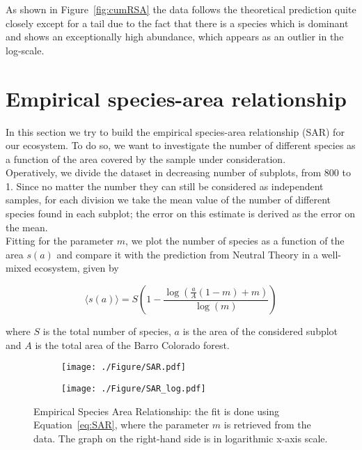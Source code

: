 \documentclass[a4paper,11pt]{article}
\begin{document}
As shown in Figure~\ref{fig:cumRSA} the data follows the theoretical prediction quite closely except for a tail due to the fact that there is a species which is dominant and shows an exceptionally high abundance, which appears as an outlier in the log-scale.


\section{Empirical species-area relationship}
In this section we try to build the empirical species-area relationship (SAR) for our ecosystem. To do so, we want to investigate the number of different species as a function of the area covered by the sample under consideration.
\\
Operatively, we divide the dataset in decreasing number of subplots, from 800 to 1. Since no matter the number they can still be considered as independent samples, for each division we take the mean value of the number of different species found in each subplot; the error on this estimate is derived as the error on the mean.
\\
Fitting for the parameter $m$, we plot the number of species as a function of the area $s(a)$ and compare it with the prediction from Neutral Theory in a well-mixed ecosystem, given by

\begin{equation}
    \label{eq:SAR}
    \langle s(a) \rangle = S \left(1- \frac{\log(\frac{a}{A}(1-m)+m)}{\log(m)}\right)
\end{equation}

where $S$ is the total number of species, $a$ is the area of the considered subplot and $A$ is the total area of the Barro Colorado forest.

\begin{figure}[htp]
  \centering
  \begin{subfigure}{.49\textwidth}
    \centering
    \texttt{[image: ./Figure/SAR.pdf]}  
  \label{fig:SARnormal}
  \end{subfigure}%
  \begin{subfigure}{.49\textwidth}
  \centering
  \texttt{[image: ./Figure/SAR\_log.pdf]}  
  \label{fig:SARlog}
  \end{subfigure}
  \caption{Empirical Species Area Relationship: the fit is done using Equation~\ref{eq:SAR}, where the parameter $m$ is retrieved from the data. The graph on the right-hand side is in logarithmic x-axis scale.}
  \label{fig:SAR}
\end{figure}
\end{document}
